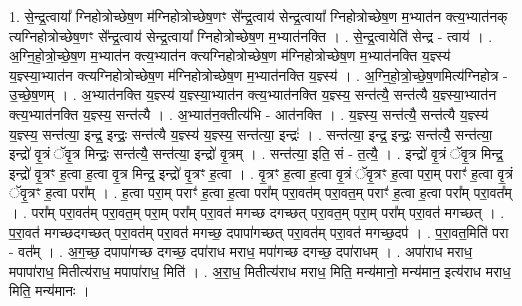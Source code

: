\documentclass[17pt]{extarticle}
\begin{document}
1. से॒न्द्र॒त्वाया᳚ ग्निहोत्रोच्छेष॒ण म॑ग्निहोत्रोच्छेष॒णꣳ से᳚न्द्र॒त्वाय॑ सेन्द्र॒त्वाया᳚ ग्निहोत्रोच्छेष॒ण म॒भ्यात॑न क्त्य॒भ्यात॑नक् त्यग्निहोत्रोच्छेष॒णꣳ से᳚न्द्र॒त्वाय॑ सेन्द्र॒त्वाया᳚ ग्निहोत्रोच्छेष॒ण म॒भ्यात॑नक्ति । . से॒न्द्र॒त्वायेति॑ सेन्द्र - त्वाय॑ । . अ॒ग्नि॒हो॒त्रो॒च्छे॒ष॒ण म॒भ्यात॑न क्त्य॒भ्यात॑न क्त्यग्निहोत्रोच्छेष॒ण म॑ग्निहोत्रोच्छेष॒ण म॒भ्यात॑नक्ति य॒ज्ञ्स्य॑ य॒ज्ञ्स्या॒भ्यात॑न क्त्यग्निहोत्रोच्छेष॒ण म॑ग्निहोत्रोच्छेष॒ण म॒भ्यात॑नक्ति य॒ज्ञ्स्य॑ । . अ॒ग्नि॒हो॒त्रो॒च्छे॒ष॒णमित्य॑ग्निहोत्र - उ॒च्छे॒ष॒णम् । . अ॒भ्यात॑नक्ति य॒ज्ञ्स्य॑ य॒ज्ञ्स्या॒भ्यात॑न क्त्य॒भ्यात॑नक्ति य॒ज्ञ्स्य॒ सन्त॑त्यै॒ सन्त॑त्यै य॒ज्ञ्स्या॒भ्यात॑न क्त्य॒भ्यात॑नक्ति य॒ज्ञ्स्य॒ सन्त॑त्यै । . अ॒भ्यात॑न॒क्तीत्य॑भि - आत॑नक्ति । . य॒ज्ञ्स्य॒ सन्त॑त्यै॒ सन्त॑त्यै य॒ज्ञ्स्य॑ य॒ज्ञ्स्य॒ सन्त॑त्या॒ इन्द्र॒ इन्द्रः॒ सन्त॑त्यै य॒ज्ञ्स्य॑ य॒ज्ञ्स्य॒ सन्त॑त्या॒ इन्द्रः॑ । . सन्त॑त्या॒ इन्द्र॒ इन्द्रः॒ सन्त॑त्यै॒ सन्त॑त्या॒ इन्द्रो॑ वृ॒त्रं ॅवृ॒त्र मिन्द्रः॒ सन्त॑त्यै॒ सन्त॑त्या॒ इन्द्रो॑ वृ॒त्रम् । . सन्त॑त्या॒ इति॒ सं - त॒त्यै॒ । . इन्द्रो॑ वृ॒त्रं ॅवृ॒त्र मिन्द्र॒ इन्द्रो॑ वृ॒त्रꣳ ह॒त्वा ह॒त्वा वृ॒त्र मिन्द्र॒ इन्द्रो॑ वृ॒त्रꣳ ह॒त्वा । . वृ॒त्रꣳ ह॒त्वा ह॒त्वा वृ॒त्रं ॅवृ॒त्रꣳ ह॒त्वा परा॒म् पराꣳ॑ ह॒त्वा वृ॒त्रं ॅवृ॒त्रꣳ ह॒त्वा परा᳚म् । . ह॒त्वा परा॒म् पराꣳ॑ ह॒त्वा ह॒त्वा परा᳚म् परा॒वत॑म् परा॒वत॒म् पराꣳ॑ ह॒त्वा ह॒त्वा परा᳚म् परा॒वत᳚म् । . परा᳚म् परा॒वत॑म् परा॒वत॒म् परा॒म् परा᳚म् परा॒वत॑ मगच्छ दगच्छत् परा॒वत॒म् परा॒म् परा᳚म् परा॒वत॑ मगच्छत् । . प॒रा॒वत॑ मगच्छदगच्छत् परा॒वत॑म् परा॒वत॑ मगच्छ॒ दपापा॑गच्छत् परा॒वत॑म् परा॒वत॑ मगच्छ॒दप॑ । . प॒रा॒वत॒मिति॑ परा - वत᳚म् । . अ॒ग॒च्छ॒ दपापा॑गच्छ दगच्छ॒ दपा॑राध मराध॒ मपा॑गच्छ दगच्छ॒ दपा॑राधम् । . अपा॑राध मराध॒ मपापा॑राध॒ मितीत्य॑राध॒ मपापा॑राध॒ मिति॑ । . अ॒रा॒ध॒ मितीत्य॑राध मराध॒ मिति॒ मन्य॑मानो॒ मन्य॑मान॒ इत्य॑राध मराध॒ मिति॒ मन्य॑मानः । \newline
\end{document}
